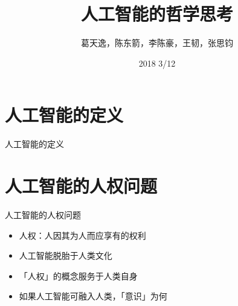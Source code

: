 \documentclass{beamer}
\title{人工智能的哲学思考}
\date{2018 3/12}
\author{葛天逸，陈东箭，李陈豪，王韧，张思钧}
\institute{马克思主义基本原理概论课堂讨论}
\begin{document}
  \maketitle
  \tableofcontents
  \section{人工智能的定义}
  \begin{frame}{人工智能的定义}
  \end{frame}
  \section{人工智能的人权问题}
  \begin{frame}{人工智能的人权问题}
    \begin{itemize}
     \item 人权：人因其为人而应享有的权利 
     \item 人工智能脱胎于人类文化
     \item 「人权」的概念服务于人类自身  
     \item 如果人工智能可融入人类，「意识」为何
    \end{itemize}
  \end{frame}
  
\end{document}
